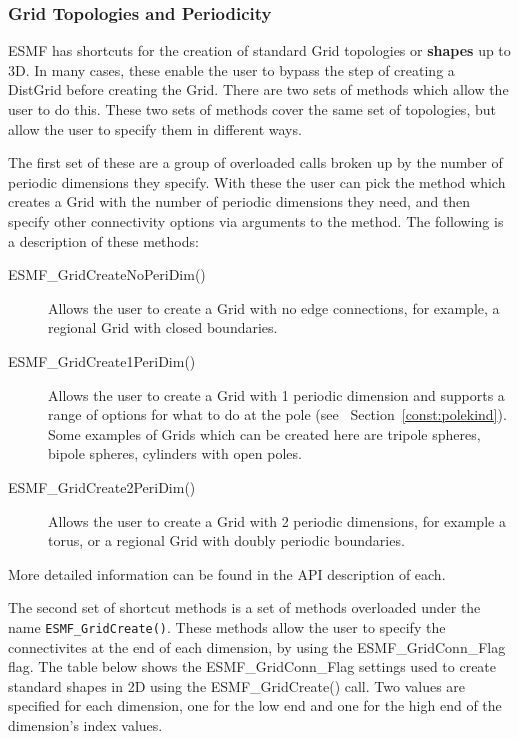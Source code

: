 \subsubsection{Grid Topologies and Periodicity}
\label{sec:ShapeShortcut}
\begin{sloppypar}
ESMF has shortcuts for the creation of standard Grid topologies 
or {\bf shapes} up to 3D.  In many cases, these enable the user to
bypass the step of creating a DistGrid before creating the Grid. 
There are two sets of methods which allow the user to do this. These two sets of methods cover the same set of topologies, but
allow the user to specify them in different ways.

 The first set of these are a group of overloaded
calls broken up by the number of periodic dimensions they specify. With these the user can pick 
the method which creates a Grid with the number of periodic dimensions they need, and then specify other connectivity 
options via arguments to the method. The following is a description of these methods:  
\end{sloppypar}

\medskip

\begin{description}
\item [ESMF\_GridCreateNoPeriDim()] Allows the user to create a Grid with no edge connections, for example, a regional Grid with closed boundaries.

\item [ESMF\_GridCreate1PeriDim()] Allows the user to create a Grid with 1 periodic dimension and supports a range of options for what to do at the pole (see ~Section~\ref{const:polekind}). Some examples of Grids which can be created here are tripole spheres, bipole spheres, cylinders with open poles. 

\item [ESMF\_GridCreate2PeriDim()] Allows the user to create a Grid with 2 periodic dimensions, for example a torus, or a regional Grid with
doubly periodic boundaries. 
\end{description}

More detailed information can be found in the API description of each.

\medskip

\begin{sloppypar}
The second set of shortcut methods is a set of methods overloaded under the name {\tt ESMF\_GridCreate()}. These methods
allow the user to specify the connectivites at the end of each dimension, by using the ESMF\_GridConn\_Flag flag. The table below shows the ESMF\_GridConn\_Flag settings used to create 
standard shapes in 2D using the ESMF\_GridCreate() call.  Two values
are specified for each dimension, one for the low end and one for 
the high end of the dimension's index values. 
\end{sloppypar}

